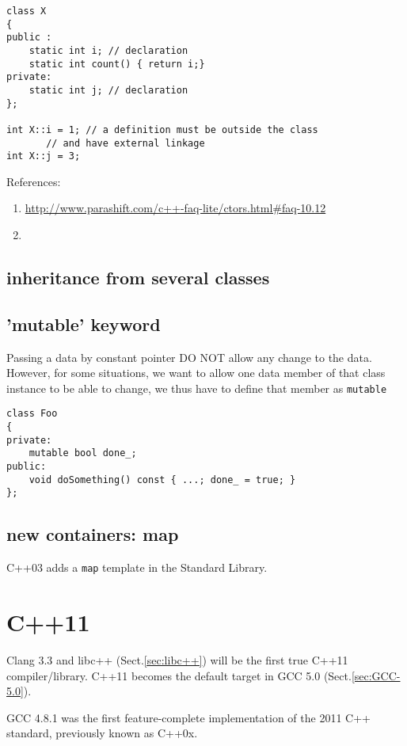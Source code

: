 \begin{lstlisting}
class X
{
public :
	static int i; // declaration
	static int count() { return i;}
private:
    static int j; // declaration
};

int X::i = 1; // a definition must be outside the class
       // and have external linkage
int X::j = 3;
\end{lstlisting}


References:
\begin{enumerate}
  \item \url{http://www.parashift.com/c++-faq-lite/ctors.html#faq-10.12}
  \item 
\end{enumerate}
\subsection{inheritance from several classes}

\subsection{'mutable' keyword}
\label{sec:mutable_keyword}

Passing a data by constant pointer DO NOT allow any change to the data. However,
for some situations, we want to allow one data member of that class instance to
be able to change, we thus have to define that member as \verb!mutable!
\begin{lstlisting}
class Foo  
{  
private:  
    mutable bool done_;  
public:  
    void doSomething() const { ...; done_ = true; }  
};
\end{lstlisting}

\subsection{new containers: map}
\label{sec:C++03_containers}

C++03 adds a \verb!map! template in the Standard Library.

\section{C++11}
\label{sec:C++11}

Clang 3.3 and libc++ (Sect.\ref{sec:libc++}) will be the first true C++11
compiler/library. C++11 becomes the default target in GCC 5.0
(Sect.\ref{sec:GCC-5.0}).

GCC 4.8.1 was the first feature-complete implementation of the 2011 C++
standard, previously known as C++0x.


